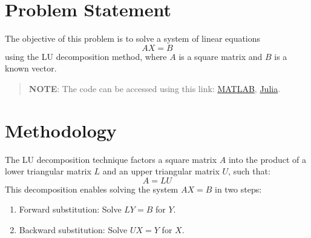 \section*{Problem Statement}
The objective of this problem is to solve a system of linear equations
\[
  AX = B
\]
using the LU decomposition method, where $A$ is a square matrix and $B$ is a known vector.

\begin{quote}
  \textbf{NOTE}: The code can be accessed using this link: \href{https://raw.githubusercontent.com/HavokSahil/computational-techniques-assignments/refs/heads/main/assignment2/a1.m}{MATLAB}, \href{https://raw.githubusercontent.com/HavokSahil/computational-techniques-assignments/refs/heads/main/assignment2/a1.jl}{Julia}.
\end{quote}

\section*{Methodology}
The LU decomposition technique factors a square matrix $A$ into the product of a lower triangular matrix $L$ and an upper triangular matrix $U$, such that:
\[
  A = LU
\]
This decomposition enables solving the system $AX = B$ in two steps:
\begin{enumerate}
  \item Forward substitution: Solve $LY = B$ for $Y$.
  \item Backward substitution: Solve $UX = Y$ for $X$.
\end{enumerate}

